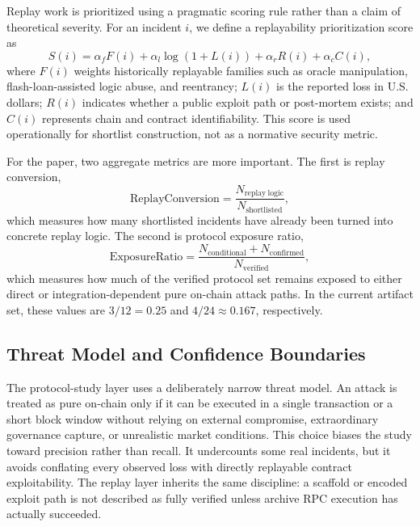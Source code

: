 Replay work is prioritized using a pragmatic scoring rule rather than a claim of theoretical severity. For an incident $i$, we define a replayability prioritization score as
\[
S(i) = \alpha_f F(i) + \alpha_l \log(1 + L(i)) + \alpha_r R(i) + \alpha_c C(i),
\]
where $F(i)$ weights historically replayable families such as oracle manipulation, flash-loan-assisted logic abuse, and reentrancy; $L(i)$ is the reported loss in U.S. dollars; $R(i)$ indicates whether a public exploit path or post-mortem exists; and $C(i)$ represents chain and contract identifiability. This score is used operationally for shortlist construction, not as a normative security metric.

For the paper, two aggregate metrics are more important. The first is replay conversion,
\[
\mathrm{ReplayConversion} = \frac{N_{\mathrm{replay\ logic}}}{N_{\mathrm{shortlisted}}},
\]
which measures how many shortlisted incidents have already been turned into concrete replay logic. The second is protocol exposure ratio,
\[
\mathrm{ExposureRatio} = \frac{N_{\mathrm{conditional}} + N_{\mathrm{confirmed}}}{N_{\mathrm{verified}}},
\]
which measures how much of the verified protocol set remains exposed to either direct or integration-dependent pure on-chain attack paths. In the current artifact set, these values are $3/12 = 0.25$ and $4/24 \approx 0.167$, respectively.

\subsection{Threat Model and Confidence Boundaries}

The protocol-study layer uses a deliberately narrow threat model. An attack is treated as pure on-chain only if it can be executed in a single transaction or a short block window without relying on external compromise, extraordinary governance capture, or unrealistic market conditions. This choice biases the study toward precision rather than recall. It undercounts some real incidents, but it avoids conflating every observed loss with directly replayable contract exploitability. The replay layer inherits the same discipline: a scaffold or encoded exploit path is not described as fully verified unless archive RPC execution has actually succeeded.
